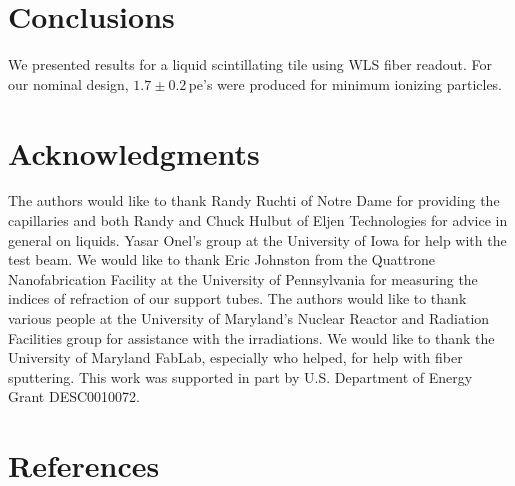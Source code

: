 \documentclass[review]{elsarticle}
\begin{document}
\section{Conclusions}

We presented results for a liquid scintillating tile using WLS fiber readout. For our nominal design, $1.7\pm 0.2$\,pe's
were produced for minimum ionizing particles.

\section{Acknowledgments}
The authors would like to thank Randy Ruchti of Notre Dame for
providing the capillaries and both Randy and Chuck Hulbut of Eljen
Technologies for
advice in general on liquids.
Yasar Onel's group at the University of
Iowa for help with the test beam. We would like to thank Eric
Johnston from the Quattrone Nanofabrication Facility at the University
of Pennsylvania for measuring the indices of refraction of our support
tubes. 
The authors would like to thank {\color{red} various people} at
the University of Maryland's Nuclear Reactor and Radiation
Facilities group for assistance
with the irradiations.
 We would like to thank the University of Maryland
FabLab, especially {\color{red} who helped}, for help with fiber sputtering.
This work was supported in part by U.S. Department of Energy
Grant DESC0010072.

\section*{References}


\end{document}
